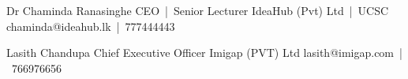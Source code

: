 

\begin{cventries}

    \cventry
    {Dr Chaminda Ranasinghe} %
    {CEO~|~Senior Lecturer} %
    {IdeaHub (Pvt) Ltd~|~UCSC} %
    {chaminda@ideahub.lk~|~777444443} %
    {
    }

    \cventry
    {Lasith Chandupa } %
    {Chief Executive Officer} %
    {Imigap (PVT) Ltd} %
    {lasith@imigap.com~|~766976656} %
    {
    }

\end{cventries}
